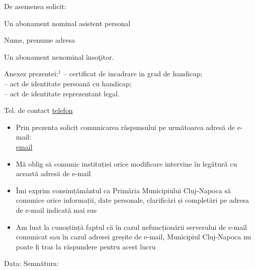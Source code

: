 \documentclass[11pt,a4paper]{article}
\newcommand{\fillline}[1][6cm]{\underline{\hspace{#1}}}
\newcommand{\checkboxempty}{$\square$}
\begin{document}
\vspace{0.25cm}

De asemenea solicit:

\vspace{0.2cm}

Un abonament nominal asistent personal

\hspace{0.5cm}Nume, prenume \fillline[6cm] adresa \fillline[7cm]

\vspace{0.2cm}

Un abonament nenominal însoţitor.

\vspace{0.3cm}

\hspace{0.5cm}Anexez prezentei:$^{1}$ -- certificat de incadrare in grad de handicap;\\
\hspace*{3cm} -- act de identitate persoană cu handicap;\\
\hspace*{3cm} -- act de identitate reprezentant legal.

\vspace{0.25cm}

Tel. de contact \underline{ {{telefon}} }

\vspace{0.25cm}

\begin{itemize}[leftmargin=*,label=\checkboxempty]
\item Prin prezenta solicit comunicarea răspunsului pe următoarea adresă de e-mail:\\
\underline{ {{email}} }
\item Mă oblig să comunic instituției orice modificare intervine în legătură cu această adresă de e-mail
\item Îmi exprim consimțământul ca Primăria Municipiului Cluj-Napoca să comunice orice informații, date personale, clarificări și completări pe adresa de e-mail indicată mai sus
\item Am luat la cunoștință faptul că în cazul nefuncționării serverului de e-mail comunicat sau în cazul adresei greșite de e-mail, Municipiul Cluj-Napoca nu poate fi tras la răspundere pentru acest lucru
\end{itemize}

\vspace{0.25cm}

Data: \fillline[3cm] \hfill Semnătura: \fillline[4cm]
\end{document}
